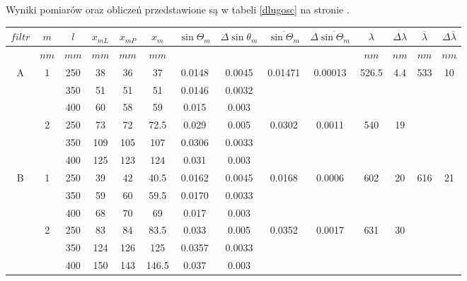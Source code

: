 \documentclass[wide,a4paper,titlepage,12pt]{mwart}
\begin{document}
Wyniki pomiarów oraz obliczeń przedstawione są w tabeli \ref{dlugosc} na stronie \pageref{dlugosc}.
    \clearpage
\begin{sidewaystable}[h] 
	\begin{center}
		\begin{tabular}
			{|c|c|c|c|c|c|c|c|c|c|c|c|c|c|} \hline $filtr$ & $m$ & $l$ & $x_{mL}$ & $x_{mP}$ & $x_m$ & $\sin{\Theta_m}$ & $\Delta \sin{\theta_m}$ & $\overline{\sin{\Theta_m}}$ & $\Delta \overline{\sin{\Theta_m}}$ & $\lambda$ & $\Delta \lambda $ & $\overline{\lambda} $ & $\Delta \overline{\lambda} $ \\
			\hline & $nm$ & $mm$ & $mm$ & $mm$ & $mm$ & & & & & $nm$ & $nm$ & $nm$ & $nm$ \\
			\hline
			
			\multirow{6}{*}{A} & \multirow{3}{*}{1} & 250 & 38 & 36 & 37 & 0.0148 & 0.0045 & \multirow{3}{*}{0.01471} & \multirow{3}{*}{0.00013}   & \multirow{3}{*}{526.5} & \multirow{3}{*}{4.4} & \multirow{6}{*}{533} & \multirow{6}{*}{10} \\
			  &  & 350 & 51 & 51 & 51 & 0.0146 & 0.0032 &  &  &  &  & &  \\
			  &  & 400 & 60 & 58 & 59 & 0.015 & 0.003 &  &  &  &  &   &  \\
			\cline{2-12}
			  & \multirow{3}{*}{2} & 250 & 73 & 72 & 72.5 & 0.029 & 0.005 &\multirow{3}{*}{0.0302} & \multirow{3}{*}{0.0011} &  \multirow{3}{*}{540} & \multirow{3}{*}{19} & &  \\
			  &  & 350 & 109 & 105 & 107 & 0.0306 & 0.0033 &  &  &   &  &  &  \\
			  &  & 400 & 125 & 123 & 124 & 0.031 & 0.003 &  &  &  &   &    &\\
			\hline
			\multirow{6}{*}{B}  & \multirow{3}{*}{1} & 250 & 39 & 42 & 40.5 & 0.0162 & 0.0045 & \multirow{3}{*}{0.0168} & \multirow{3}{*}{0.0006}  & \multirow{3}{*}{602} & \multirow{3}{*}{20} & \multirow{6}{*}{616} & \multirow{6}{*}{21} \\
			  &  & 350 & 59 & 60 & 59.5 & 0.0170 & 0.0033 &  &   &  &  &  &  \\
			  &  & 400 & 68 & 70 & 69 & 0.017 & 0.003 &  &  &   &  &  &  \\
			\cline{2-12}
			  & \multirow{3}{*}{2} & 250 & 83 & 84 & 83.5 & 0.033 & 0.005 & \multirow{3}{*}{0.0352} & \multirow{3}{*}{0.0017} & \multirow{3}{*}{631} & \multirow{3}{*}{30} & &  \\
			  &  & 350 & 124 & 126 & 125 & 0.0357 & 0.0033 &  &  &  &  &  &  \\
			  &  & 400 & 150 & 143 & 146.5 & 0.037 & 0.003 &  &  &  &  &  &  \\
			\hline 
		\end{tabular}
		\caption{\label{dlugosc}Wyniki pomiarów dla filtrów o nieznanej długości fali} 
	\end{center}
\end{sidewaystable}
\end{document}
